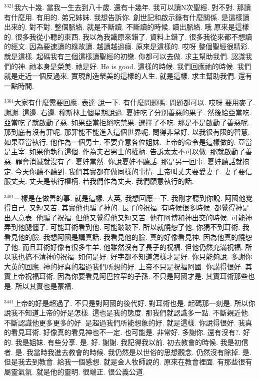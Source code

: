 \documentclass{book}
\begin{document}
$^{3321}$我六十幾.
當我一生去到八十歲.
還有十幾年.
我可以讀N次聖經.
對不對.
那讀有什麼用.
有用的.
弟兄姊妹.
我想告訴你.
創世記和啟示錄有什麼關係.
是這樣讀出來的.
對不對.
整個脈絡.
就是不斷讀.
不斷讀的時候.
讀出脈絡.
哦 原來是這樣的.
很多我從小聽的東西.
我以為我識原來錯了.
資料上錯了.
很多我從來都不想讀的經文.
因為要速讀的緣故讀.
越讀越過癮.
原來是這樣的.
哎呀 整個聖經很精彩.
就是這樣.
起碼我有三個這樣讀聖經的初戀.
你都可以去做.
求主幫助我們.
認識我們的神.
祂本身是榮美.
祂是好.
He is good.
這樣的時候.
我們回應祂的時候.
我們就是走近一個反過來.
實現創造榮美的這樣的人生.
就是這樣.
求主幫助我們.
還有一點時間.

$^{3361}$大家有什麼需要回應.
表達 說一下.
有什麼問題嗎.
問題都可以.
哎呀 要用麥了.
謝謝.
這邊.
右邊.
穆斯林上個星期說過.
夏娃吃了分別善惡的果子.
然後給亞當吃.
亞當吃了就啟動了惡.
如果亞當拒絕吃禁果.
選擇了不吃.
那是不是啟動了善惡呢.
那到底有沒有罪呢.
那罪能不能進入這個世界呢.
問得非常好.
以我很有限的智慧.
如果亞當執行.
他作為一個男士.
不要介意各位姐妹.
上帝的命令是這樣做的.
亞當是主宰.
如果他執行這個.
作為夫君男士的權柄.
告訴太太不可以做.
那就啟動了善惡.
罪會消滅就沒有了.
夏娃當然.
你說夏娃不聽話.
那是另一回事.
夏娃聽話就搞定.
今天你聽不聽到.
我們其實都在做同樣的事情.
上帝叫丈夫要愛妻子.
妻子要信服丈夫.
丈夫是執行權柄.
若我們作為丈夫.
我們願意執行的話.

$^{3401}$一樣是在做善的事.
就是這樣.
大英.
我想回應一下.
我剛才聽到你說.
阿國他覺得自己.
又短又苦.
其實他也騙了神的.
長子的祝福.
有時候很多時候.
都覺得神是出人意表.
他騙了祝福.
但他又覺得他又短又苦.
他在阿博和神出交的時候.
可能神弄到他腿僵了.
可能耳術看到他.
可能跛跛下.
所以就饒恕了他.
你猜不到耳術.
我看見他的臉.
我想阿國是講真話.
我看見他的臉.
真的好像看見神.
因為他真的饒恕了他.
而且耳術好像有很多牛羊.
他雖然沒有了長子的祝福.
但他仍然充滿祝福.
所以我也搞不清神的祝福.
如何是好.
好字都不知道怎樣才是好.
你只能夠說.
多謝你大英的回應.
神的好真的超過我們所想的好.
上帝不只是祝福阿國.
你講得很好.
其實上帝祝福耳術.
因為你要看見阿巴拉罕的子孫.
不只是阿國才是.
其實耳術那些也是.
所以其實也是蒙福.

$^{3441}$上帝的好是超過了.
不只是對阿國的後代好.
對耳術也是.
起碼那一刻是.
所以你說我不知道上帝的好是怎樣.
這也是我的態度.
那我們就認識多一點.
不斷親近他.
不斷認識他更多更多的好.
是超過我們所能想象的好.
就是這樣.
你說得很好.
我真的看見耳術.
好像真的看見神也不一定.
也可能是.
非常好.
多謝你.
還有沒有?.
好的.
我是姐妹.
有些分享.
是.
好.
謝謝.
我記得我以前.
初去教會的時候.
我是初信者.
是.
我當時我進去教會的時候.
我仍然是以世俗的思想觀念.
仍然沒有除掉.
是.
但是我去到教會.
給我一個感想.
就是金人牧師說的.
原來在教會裡面.
有那些很有屬靈氣氛.
就是他的靈明.
很端正.
很公義公道.
\end{document}
